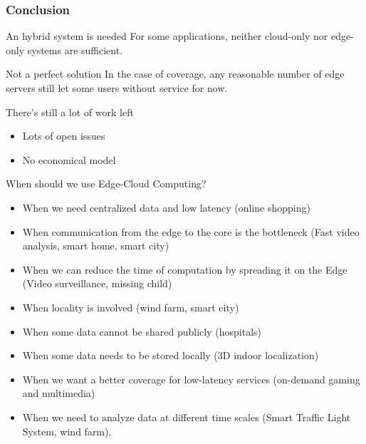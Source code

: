 \documentclass[utf8,xcolor=table, page number]{earlywinter}
\begin{document}
\begin{frame}
  \frametitle{Conclusion}

  \begin{block}{An hybrid system is needed}
    For some applications, neither cloud-only nor edge-only systems are sufficient.
  \end{block}
  \vfill
  \begin{alertblock}{Not a perfect solution}
    In the case of coverage, any reasonable number of edge servers still let some users without service for now.
  \end{alertblock}
  \vfill
  \begin{alertblock}{There's still a lot of work left}
    \begin{itemize}
      \item Lots of open issues
      \item No economical model
    \end{itemize}
  \end{alertblock}

  
\end{frame}


\begin{frame}{When should we use Edge-Cloud Computing?}
\begin{itemize}
\item When we need centralized data and low latency (online shopping)
\item When communication from the edge to the core is the bottleneck (Fast video analysis, smart home, smart city)
\item When we can reduce the time of computation by spreading it on the Edge (Video surveillance, missing child)
\item When locality is involved (wind farm, smart city)
\item When some data cannot be shared publicly (hospitals)
\item When some data needs to be stored locally (3D indoor localization)
\item When we want a better coverage for low-latency services (on-demand gaming and multimedia)
\item When we need to analyze data at different time scales (Smart Traffic Light System, wind farm). 
\end{itemize}
\end{frame}

          
\end{document}
